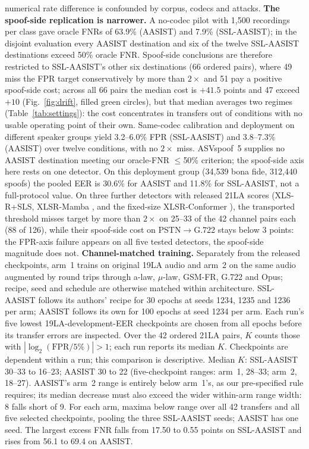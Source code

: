 \documentclass{article}
\begin{document}
numerical rate difference is confounded by corpus, codecs and attacks. \textbf{The spoof-side replication is narrower.} A no-codec pilot with 1,500 recordings per class gave oracle FNRs of 63.9\% (AASIST) and 7.9\% (SSL-AASIST); in the disjoint evaluation every AASIST destination and six of the twelve SSL-AASIST destinations exceed 50\% oracle FNR. Spoof-side conclusions are therefore restricted to SSL-AASIST's other six destinations (66 ordered pairs), where 49 miss the FPR target conservatively by more than $2\times$ and 51 pay a positive spoof-side cost; across all 66 pairs the median cost is $+41.5$ points and 47 exceed $+10$ (Fig.~\ref{fig:drift}, filled green circles), but that median averages two regimes (Table~\ref{tab:settings}): the cost concentrates in transfers out of conditions with no usable operating point of their own. Same-codec calibration and deployment on different speaker groups yield 3.2--6.0\% FPR (SSL-AASIST) and 3.8--7.3\% (AASIST) over twelve conditions, with no $2\times$ miss. ASVspoof~5 supplies no AASIST destination meeting our oracle-FNR $\le$50\% criterion; the spoof-side axis here rests on one detector. On this deployment group (34,539 bona fide, 312,440 spoofs) the pooled EER is 30.6\% for AASIST and 11.8\% for SSL-AASIST, not a full-protocol value. On three further detectors with released 21LA scores (XLS-R+SLS, XLSR-Mamba \cite{xlsrmamba}, and the fixed-size XLSR-Conformer \cite{rosello23}), the transported threshold misses target by more than $2\times$ on 25--33 of the 42 channel pairs each (88 of 126), while their spoof-side cost on PSTN$\to$G.722 stays below 3 points: the FPR-axis failure appears on all five tested detectors, the spoof-side magnitude does not. \textbf{Channel-matched training.} Separately from the released checkpoints, arm~1 trains on original 19LA audio and arm~2 on the same audio augmented by round trips through a-law, $\mu$-law, GSM-FR, G.722 and Opus; recipe, seed and schedule are otherwise matched within architecture. SSL-AASIST follows its authors' recipe \cite{tak22} for 30 epochs at seeds 1234, 1235 and 1236 per arm; AASIST follows its own \cite{jung22} for 100 epochs at seed 1234 per arm. Each run's five lowest 19LA-development-EER checkpoints are chosen from all epochs before its transfer errors are inspected. Over the 42 ordered 21LA pairs, $K$ counts those with $|\log_2(\mathrm{FPR}/5\%)|>1$; each run reports its median $K$. Checkpoints are dependent within a run; this comparison is descriptive. Median $K$: SSL-AASIST 30--33 to 16--23; AASIST 30 to 22 (five-checkpoint ranges: arm~1, 28--33; arm~2, 18--27). AASIST's arm~2 range is entirely below arm~1's, as our pre-specified rule requires; its median decrease must also exceed the wider within-arm range width: 8 falls short of 9. For each arm, maxima below range over all 42 transfers and all five selected checkpoints, pooling the three SSL-AASIST seeds; AASIST has one seed. The largest excess FNR falls from 17.50 to 0.55 points on SSL-AASIST and rises from 56.1 to 69.4 on AASIST.
\end{document}
